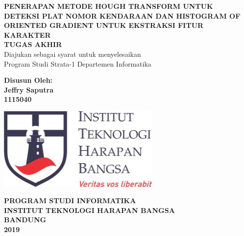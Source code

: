 \begin{titlepage}
\begin{center}
	\onehalfspacing
	{\large \bfseries PENERAPAN METODE HOUGH TRANSFORM UNTUK DETEKSI PLAT NOMOR KENDARAAN DAN HISTOGRAM OF ORIENTED GRADIENT UNTUK EKSTRAKSI FITUR KARAKTER\\
	\vspace{1.5cm}
	 \large TUGAS AKHIR}\\
           Diajukan sebagai syarat untuk menyelesaikan\\ Program Studi Strata-1 Departemen Informatika

	\vspace{1.5cm}
          {\bfseries Disusun Oleh: \\
           Jeffry Saputra \\
	1115040}
	
	\vspace{1.5cm}
	\includegraphics[width=8cm]{images/ithb.jpg}
	
	
	\vspace{3.5cm}
	
{\large \bfseries PROGRAM STUDI INFORMATIKA \\
INSTITUT TEKNOLOGI HARAPAN BANGSA \\
BANDUNG\\
2019}

	
\end{center}

\end{titlepage}

\newpage
